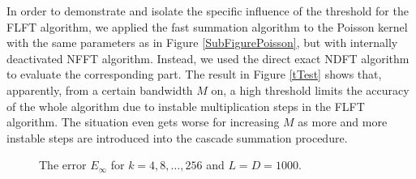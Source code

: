In order to 
demonstrate and isolate the specific influence of the threshold 
for the FLFT algorithm, we applied the fast summation algorithm 
to the Poisson kernel with the same parameters as in Figure 
\ref{SubFigurePoisson}, but with internally deactivated NFFT 
algorithm. Instead, we used the direct exact NDFT algorithm to 
evaluate the corresponding part. The result in Figure \ref{tTest}
shows that, 
apparently, from a certain bandwidth $M$ on, a high threshold 
limits the accuracy of the
whole algorithm due to instable multiplication steps in the
FLFT algorithm. The situation even gets worse for increasing
$M$ as more and more instable steps are introduced into the 
cascade summation procedure.

\begin{figure}[tb]
  \centering
  \hfill
  \caption{The error $E_{\infty}$ for $k = 4,8,\ldots,256$ and $L = D = 1000$.}
  \label{Figure:PoissonTest}
\end{figure}

